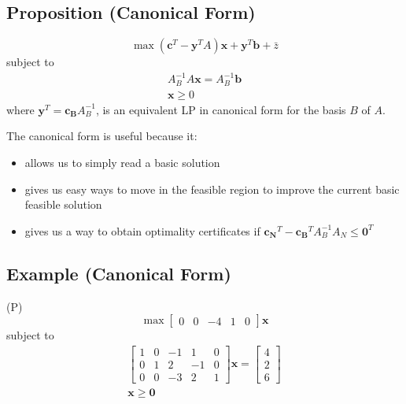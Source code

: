 \subsection{Proposition (Canonical Form)}
\[\max (\mathbf{c}^T-\mathbf{y}^TA)\mathbf{x}+\mathbf{y}^T\mathbf{b}+\bar{z}\]
subject to
\begin{align*}
    A_B^{-1}A\mathbf{x}=A_B^{-1}\mathbf{b}\\
    \mathbf{x}\ge 0
\end{align*}
where $\mathbf{y}^T=\mathbf{c_B}A_B^{-1}$, is an equivalent LP in canonical form for the 
basis $B$ of $A$.


The canonical form is useful because it:
\begin{itemize}
    \item allows us to simply read a basic solution
    \item gives us easy ways to move in the feasible region to improve the current basic
    feasible solution
    \item gives us a way to obtain optimality certificates if
    $\mathbf{c_N}^T-\mathbf{c_B}^TA_B^{-1}A_N\le \mathbf{0}^T$
\end{itemize}

\subsection{Example (Canonical Form)}
(P)
\[\max \begin{bmatrix}
    0 & 0 & -4 & 1 & 0
\end{bmatrix}\mathbf{x}\]
subject to
\begin{align*}
    \begin{bmatrix}
        1 & 0 & -1 & 1 & 0\\
        0 & 1 & 2 & -1 & 0\\
        0 & 0 & -3 & 2 & 1
    \end{bmatrix}\mathbf{x}
    =
    \begin{bmatrix}
        4\\
        2\\
        6
    \end{bmatrix}\\
    \mathbf{x}\ge \mathbf{0}
\end{align*}


